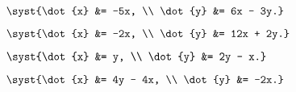 \begin{multicols}{4}
\begin{enumtasks}
			\label{linsys_hmg:simple2d}
			\item \( \syst{\dot{x} &= -5x, \\ \dot{y} &= 6x - 3y.} \) %
			\item \( \syst{\dot{x} &= -2x, \\ \dot{y} &= 12x + 2y.} \) %
			\item \( \syst{\dot{x} &= y, \\ \dot{y} &= 2y - x.} \) %
			\item \( \syst{\dot{x} &= 4y - 4x, \\ \dot{y} &= -2x.} \) %

\end{enumtasks}
\end{multicols}
